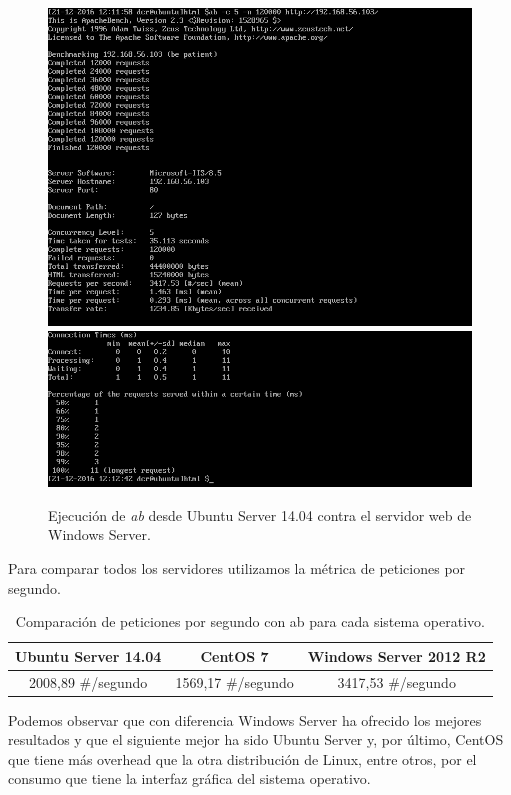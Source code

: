 \begin{figure}[H]
	\centering
	\includegraphics[scale=0.6]{abWindows1.png}
	\includegraphics[scale=0.6]{abWindows2.png}
	\caption{Ejecución de \textit{ab} desde Ubuntu Server 14.04 contra el servidor web de Windows Server.}
\end{figure}

Para comparar todos los servidores utilizamos la métrica de peticiones por segundo.
\begin{table}[H]
	\centering
	\label{my-label}
	\begin{tabular}{|c|c|c|}
		\hline
		\textbf{Ubuntu Server 14.04} & \textbf{CentOS 7}        & \textbf{Windows Server 2012 R2} \\ \hline
		2008,89 \#/segundo    & 1569,17 \#/segundo  & 3417,53 \#/segundo        \\ \hline
	\end{tabular}
	\caption{Comparación de peticiones por segundo con ab para cada sistema operativo.}
\end{table}

Podemos observar que con diferencia Windows Server ha ofrecido los mejores resultados y que el siguiente mejor ha sido Ubuntu Server y, por último, CentOS que tiene más overhead que la otra distribución de Linux, entre otros, por el consumo que tiene la interfaz gráfica del sistema operativo.
